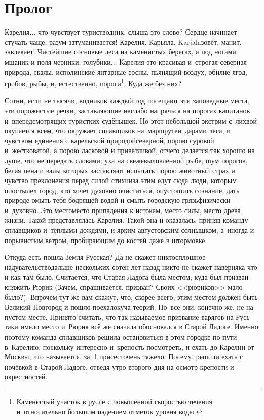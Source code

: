 {

{
\cleardoublepage
{}


\section*{Пролог}

\fancyhead[LE]{\fancyplain{}{}}
\fancyhead[RO]{\fancyplain{}{}}

Карелия$\ldots$ что чувствует турист\sdash водник, слыша это слово? Сердце начинает стучать чаще, разум затуманивается! Карелия, Карьяла, Karjala\mdash зовёт, манит, завлекает! Чистейшие сосновые леса на каменистых берегах, а под ногами мшаник и поля черники, голубики$\ldots$ Карелия это красивая и~строгая северная природа, скалы, исполинские янтарные сосны, пьянящий воздух, обилие ягод, грибов, рыбы, и, естественно, пороги\footnote{Каменистый участок в русле с повышенной скоростью течения и~относительно большим падением отметок уровня воды.}. Куда же без них? 

Сотни, если не тысячи, водников каждый год посещают эти заповедные места, эти порожистые речки, заставляющие неслабо напрячься на порогах капитанов и~впередсмотрящих туристких судёнышек. Но этот небольшой экстрим с~лихвой окупается всем, что окружает сплавщиков на~маршруте\mdash и~дарами леса, и чувством единения с карельской природой\mdash северной, порою суровой и~жестковатой, а порою ласковой и приветливой, отчего делается так хорошо на душе, что не передать словами; уха на свежевыловленной рыбе, шум порогов, белая пена и валы которых заставляют испытать порою животный страх и чувство преклонения перед силой стихии\mdash за этим едут сюда люди, которым опостылел город, кто хочет духовно очиститься, опустошить сознание, дать природе омыть тебя бодрящей водой и смыть городскую грязь\mdash физически и~духовно. Это место\mdash место припадения к истокам, место силы, место древа жизни. Такой представлялась Карелия. Такой она и оказалась, приняв команду сплавщиков и~тёплыми дождями, и ярким августовским солнышком, а~иногда и порывистым ветром, пробирающим до костей даже в штормовке.  

Откуда есть пошла Земля Русская? Да не скажет никто\mdash сплошное надувательство\mdash дальше нескольких сотен лет назад никто не скажет наверняка что и как там было. Считается, что Старая Ладога была местом, куда был призван княжить Рюрик (Зачем, спрашивается, призван? Своих <<рюриков>> мало было?). Впрочем тут же вам скажут, что, скорее всего, этим местом должен быть Великий Новгород и пошло поехало\mdash куча теорий. Но~все они, конечно же, не на пустом месте. Принято считать, что так называемое призвание варягов на Русь таки имело место и~Рюрик всё же сначала обосновался в Старой Ладоге. Именно поэтому команда сплавщиков решила остановиться в этом городке по пути в~Карелию, поскольку интересно и~крепость посмотреть, и ехать до Карелии от Москвы, что называется, за~1 присест\mdash очень тяжело. Посему, решили ехать с ночёвкой в Старой Ладоге, отведя утро второго дня на осмотр крепости и окрестностей. 

}}
